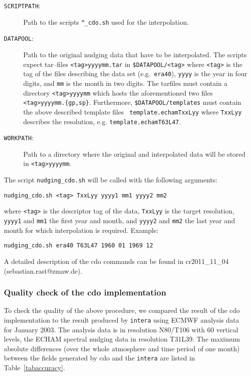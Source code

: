 \begin{appendix}
\begin{description}
\item[{\tt SCRIPTPATH}:] Path to the scripts {\tt $\ast$\_cdo.sh} used
  for the interpolation.
\item[{\tt DATAPOOL}:] Path to the original nudging data that have to
  be interpolated. The scripts expect tar--files {\tt <tag>yyyymm.tar}
  in {\tt \$DATAPOOL/<tag>}  where {\tt <tag>} is the tag of the files
  describing the data 
  set (e.g.~{\tt era40}), {\tt yyyy} is the year in four digits, and
  {\tt mm} is the month in two digits. The tarfiles must contain a
  directory {\tt <tag>yyyymm} which hosts the aforementioned two files 
  {\tt <tag>yyyymm.\{gp,sp\}}. Furthermore, {\tt \$DATAPOOL/templates}
  must contain the above described template files {\tt
    template.echamTxxLyy} where {\tt TxxLyy} describes the resolution,
  e.g. {\tt template.echamT63L47}.
\item[{\tt WORKPATH}:] Path to a directory where the original and
  interpolated data will be stored in {\tt <tag>yyyymm}. 
\end{description}

The script {\tt nudging\_cdo.sh} will be called with the following
arguments:

\begin{lstlisting}
nudging_cdo.sh <tag> TxxLyy yyyy1 mm1 yyyy2 mm2
\end{lstlisting}

where {\tt <tag>} is the descriptor tag of the data, {\tt TxxLyy} is
the target resolution, {\tt yyyy1} and {\tt mm1} the first year and
month, and {\tt yyyy2} and {\tt mm2} the last
year and month for which interpolation is required. Example:

\begin{lstlisting}
nudging_cdo.sh era40 T63L47 1960 01 1969 12
\end{lstlisting}

A detailed description of the cdo commands can be found in
cr2011\_11\_04 (sebastian.rast@zmaw.de).

\subsubsection{Quality check of the cdo implementation}

To check the quality of the above procedure, we compared the result of
the cdo implementation to the result produced by {\tt intera} using
ECMWF analysis data for January 2003. The analysis data is in
resolution N80/T106 with 60 vertical levels, the ECHAM spectral
nudging data in resolution T31L39. The maximum absolute differences
(over the whole atmosphere and time period of one month) between the
fields generated by cdo and the {\tt intera} are listed in
Table~\ref{tabaccuracy}.  



\end{appendix}
